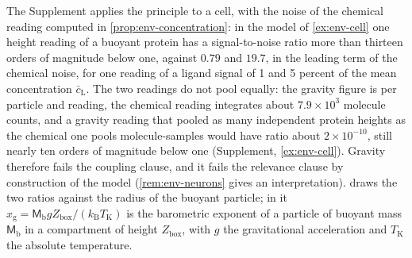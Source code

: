 The Supplement applies the principle to a cell, with the noise of the chemical reading computed in \cref{prop:env-concentration}: in the model of \cref{ex:env-cell} one height reading of a buoyant protein has a signal-to-noise ratio more than thirteen orders of magnitude below one, against $0.79$ and $19.7$, in the leading term of the chemical noise, for one reading of a ligand signal of 1 and 5 percent of the mean concentration $\bar c_{\mathrm L}$. The two readings do not pool equally: the gravity figure is per particle and reading, the chemical reading integrates about $7.9\times10^3$ molecule counts, and a gravity reading that pooled as many independent protein heights as the chemical one pools molecule-samples would have ratio about $2\times10^{-10}$, still nearly ten orders of magnitude below one (Supplement, \cref{ex:env-cell}). Gravity therefore fails the coupling clause, and it fails the relevance clause by construction of the model (\cref{rem:env-neurons} gives an interpretation).  draws the two ratios against the radius of the buoyant particle; in it $x_{\mathrm g}=\mathsf M_{\mathrm b}gZ_{\mathrm{box}}/(k_{\mathrm B}T_{\mathrm K})$ is the barometric exponent of a particle of buoyant mass $\mathsf M_{\mathrm b}$ in a compartment of height $Z_{\mathrm{box}}$, with $g$ the gravitational acceleration and $T_{\mathrm K}$ the absolute temperature.

